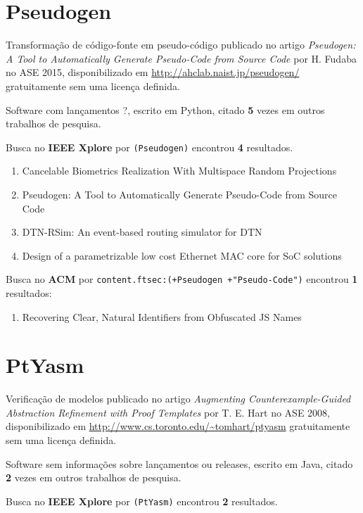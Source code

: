 \section{Pseudogen}

Transformação de código-fonte em pseudo-código
publicado no artigo {\it Pseudogen: A Tool to Automatically Generate Pseudo-Code from Source Code}
por H. Fudaba
no ASE 2015,
disponibilizado em \url{http://ahclab.naist.jp/pseudogen/}
gratuitamente
sem uma licença definida.

Software com lançamentos ?,
escrito em Python,
citado {\bf 5} vezes em outros trabalhos de pesquisa.

Busca no {\bf IEEE Xplore} por
\texttt{(Pseudogen)}
encontrou {\bf 4}
resultados.

\begin{enumerate}
\item Cancelable Biometrics Realization With Multispace Random Projections
\item Pseudogen: A Tool to Automatically Generate Pseudo-Code from Source Code
\item DTN-RSim: An event-based routing simulator for DTN
\item Design of a parametrizable low cost Ethernet MAC core for SoC solutions
\end{enumerate}

Busca no {\bf ACM} por
\texttt{content.ftsec:(+Pseudogen +"Pseudo-Code")}
encontrou {\bf 1}
resultados:

\begin{enumerate}
\item Recovering Clear, Natural Identifiers from Obfuscated JS Names
\end{enumerate}

\section{PtYasm}

Verificação de modelos
publicado no artigo {\it Augmenting Counterexample-Guided Abstraction Refinement with Proof Templates}
por T. E. Hart
no ASE 2008,
disponibilizado em \url{http://www.cs.toronto.edu/~tomhart/ptyasm}
gratuitamente
sem uma licença definida.

Software sem informações sobre lançamentos ou releases,
escrito em Java,
citado {\bf 2} vezes em outros trabalhos de pesquisa.

Busca no {\bf IEEE Xplore} por
\texttt{(PtYasm)}
encontrou {\bf 2}
resultados.

